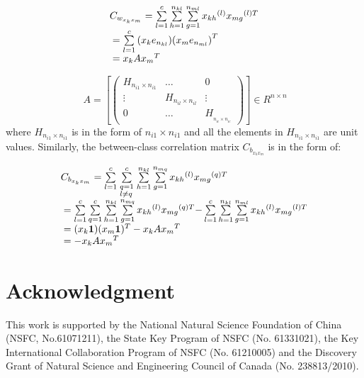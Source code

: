\documentclass[journal]{IEEEtran}
\begin{document}
\begin{equation} \begin{array}{l}
{C_{{w_{{x_k}{x_m}}}}} = \sum\limits_{l = 1}^c {\sum\limits_{h = 1}^{{n_{kl}}} {\sum\limits_{g = 1}^{{n_{ml}}} {{x_{kh}}^{(l)}{x_{mg}}^{(l)T}} } } \\
{\rm{    }} = \sum\limits_{l = 1}^c {({x_k}{e_{{n_{kl}}}}){{({x_m}{e_{{n_{ml}}}})}^T}} \\
{\rm{    }} = {x_k}A{x_m}^T
\end{array} \end{equation}


\begin{equation} \ A = \left[ {\left( {\begin{array}{*{20}{c}}{{H_{{n_{i1}} \times {n_{i1}}}}}& \ldots &0\\
 \vdots &{{H_{{n_{il}} \times {n_{il}}}}}& \vdots \\
0& \ldots &{{H_{_{{n_{ic}} \times {n_{ic}}}}}}
\end{array}} \right)} \right] \in {R^{n \times n}} \end{equation}
where ${H_{{n_{i{1}}} \times {n_{i1}}}}$ is in the form of ${n_{i1}} \times {n_{i1}}$ and all the elements in ${H_{{n_{i{1}}} \times {n_{i1}}}}$ are unit values. Similarly, the between-class correlation matrix ${C_{{b_{{x_k}{x_m}}}}}$ is in the form of:

\begin{equation} \begin{array}{l}
{C_{{b_{{x_k}{x_m}}}}} = \sum\limits_{l = 1}^c {\sum\limits_{\scriptstyle q = 1\hfill\atop
\scriptstyle l \ne q\hfill}^c {\sum\limits_{h = 1}^{{n_{kl}}} {\sum\limits_{g = 1}^{{n_{mq}}} {{x_{kh}}^{(l)}{x_{mg}}^{(q)T}} } } } \\
{\rm{    }} = \sum\limits_{l = 1}^c {\sum\limits_{q = 1}^c {\sum\limits_{h = 1}^{{n_{kl}}} {\sum\limits_{g = 1}^{{n_{mq}}} {{x_{kh}}^{(l)}{x_{mg}}^{(q)T} - } } } } \sum\limits_{l = 1}^c {\sum\limits_{h = 1}^{{n_{kl}}} {\sum\limits_{g = 1}^{{n_{ml}}} {{x_{kh}}^{(l)}{x_{mg}}^{(l)T}} } } \\
{\rm{    }} = ({x_k}{\bf{1}}){({x_m}{\bf{1}})^T} - {x_k}A{x_m}^T\\
{\rm{    }} =  - {x_k}A{x_m}^T
\end{array} \end{equation}

\section*{Acknowledgment}
This work is supported by the National Natural Science Foundation of China (NSFC, No.61071211), the State Key Program of NSFC (No. 61331021), the Key International Collaboration Program of NSFC (No. 61210005) and the Discovery Grant of Natural Science and Engineering Council of Canada (No. 238813/2010).
\end{document}
